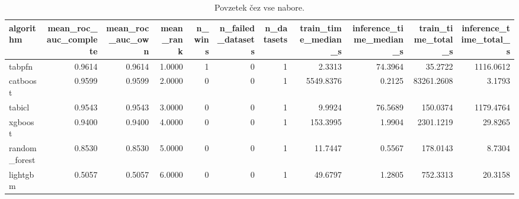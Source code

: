 \begin{table}[htbp]
\centering
\caption{Povzetek čez vse nabore.}
\label{tab:overall}
\begin{tabular}{lrrrrrrrrrr}
\hline
algorithm & mean\_roc\_auc\_complete & mean\_roc\_auc\_own & mean\_rank & n\_wins & n\_failed\_datasets & n\_datasets & train\_time\_median\_s & inference\_time\_median\_s & train\_time\_total\_s & inference\_time\_total\_s \\
\hline
tabpfn & 0.9614 & 0.9614 & 1.0000 & 1 & 0 & 1 & 2.3313 & 74.3964 & 35.2722 & 1116.0612 \\
catboost & 0.9599 & 0.9599 & 2.0000 & 0 & 0 & 1 & 5549.8376 & 0.2125 & 83261.2608 & 3.1793 \\
tabicl & 0.9543 & 0.9543 & 3.0000 & 0 & 0 & 1 & 9.9924 & 76.5689 & 150.0374 & 1179.4764 \\
xgboost & 0.9400 & 0.9400 & 4.0000 & 0 & 0 & 1 & 153.3995 & 1.9904 & 2301.1219 & 29.8265 \\
random\_forest & 0.8530 & 0.8530 & 5.0000 & 0 & 0 & 1 & 11.7447 & 0.5567 & 178.0143 & 8.7304 \\
lightgbm & 0.5057 & 0.5057 & 6.0000 & 0 & 0 & 1 & 49.6797 & 1.2805 & 752.3313 & 20.3158 \\
\hline
\end{tabular}
\end{table}
